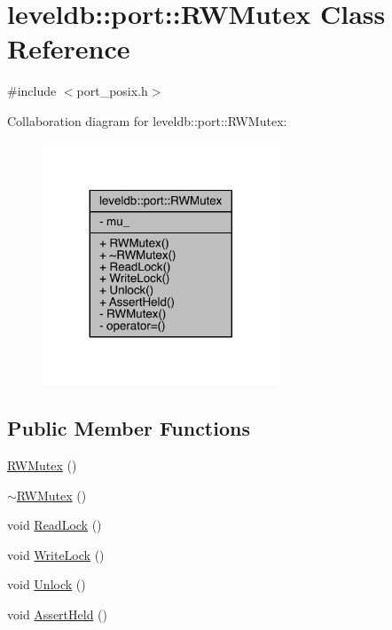 \hypertarget{classleveldb_1_1port_1_1_r_w_mutex}{}\section{leveldb\+:\+:port\+:\+:R\+W\+Mutex Class Reference}
\label{classleveldb_1_1port_1_1_r_w_mutex}


{\ttfamily \#include $<$port\+\_\+posix.\+h$>$}



Collaboration diagram for leveldb\+:\+:port\+:\+:R\+W\+Mutex\+:\nopagebreak
\begin{figure}[H]
\begin{center}
\leavevmode
\includegraphics[width=200pt]{classleveldb_1_1port_1_1_r_w_mutex__coll__graph}
\end{center}
\end{figure}
\subsection*{Public Member Functions}
\begin{DoxyCompactItemize}
\item 
\hyperlink{classleveldb_1_1port_1_1_r_w_mutex_a4f36bce013a7083faf5d5b66ab6a3577}{R\+W\+Mutex} ()
\item 
\hyperlink{classleveldb_1_1port_1_1_r_w_mutex_a2f57278a8f1ee0934b54879c78a82202}{$\sim$\+R\+W\+Mutex} ()
\item 
void \hyperlink{classleveldb_1_1port_1_1_r_w_mutex_a343a2ce5c7051378c945e98c77981dbc}{Read\+Lock} ()
\item 
void \hyperlink{classleveldb_1_1port_1_1_r_w_mutex_ad2ef416ac41375c282e378c296a1852e}{Write\+Lock} ()
\item 
void \hyperlink{classleveldb_1_1port_1_1_r_w_mutex_ac35f19efd6c082b5437888306aa0d3e7}{Unlock} ()
\item 
void \hyperlink{classleveldb_1_1port_1_1_r_w_mutex_ae7d68fe6baa0fa767ad26ff746236571}{Assert\+Held} ()
\end{DoxyCompactItemize}
